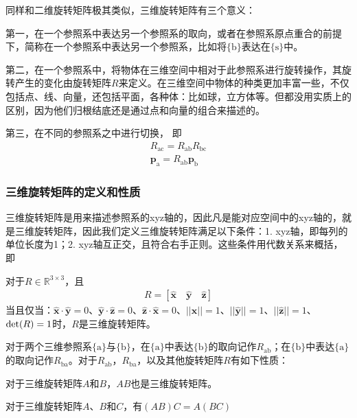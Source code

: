 \documentclass[12pt, a4paper, article, UTF8]{ctexart}
\begin{document}
同样和二维旋转矩阵极其类似，三维旋转矩阵有三个意义：

第一，在一个参照系中表达另一个参照系的取向，或者在参照系原点重合的前提下，简称在一个参照系中表达另一个参照系，比如将$\{\text{b}\}$表达在$\{\text{s}\}$中。

第二，在一个参照系中，将物体在三维空间中相对于此参照系进行旋转操作，其旋转产生的变化由旋转矩阵$R$来定义。在三维空间中物体的种类更加丰富一些，不仅包括点、线、向量，还包括平面，各种体：比如球，立方体等。但都没用实质上的区别，因为他们归根结底还是通过点和向量的组合来描述的。

第三，在不同的参照系之中进行切换， 即
\begin{align}
R_\text{ac} = R_\text{ab}R_\text{bc} \\
\mathbf{p}_\text{a} = R_\text{ab}\mathbf{p}_\text{b}
\end{align}


\subsubsection{三维旋转矩阵的定义和性质}
三维旋转矩阵是用来描述参照系的xyz轴的，因此凡是能对应空间中的xyz轴的，就是三维旋转矩阵，因此我们定义三维旋转矩阵满足以下条件：1. xyz轴，即每列的单位长度为1；2. xyz轴互正交，且符合右手正则。这些条件用代数关系来概括，即
\begin{mydefinition}
对于$R\in\mathbb{R}^{3\times3}$，且
\begin{align}
R = [\hat{\mathbf{x}} \quad \hat{\mathbf{y}} \quad \hat{\mathbf{z}}]
\end{align}
当且仅当：$\hat{\mathbf{x}}\cdot\hat{\mathbf{y}} = 0$、$\hat{\mathbf{y}}\cdot\hat{\mathbf{z}} = 0$、$\hat{\mathbf{z}}\cdot\hat{\mathbf{x}} = 0$、$||\hat{\mathbf{x}}|| = 1$、$||\hat{\mathbf{y}}|| = 1$、$||\hat{\mathbf{z}}|| = 1$、$\textnormal{det}(R) = 1$时，$R$是三维旋转矩阵。 \label{th:3drotation}
\end{mydefinition}

对于两个三维参照系$\{\text{a}\}$与$\{\text{b}\}$，在$\{\text{a}\}$中表达$\{\text{b}\}$的取向记作$R_\text{ab}$；在$\{\text{b}\}$中表达$\{\text{a}\}$的取向记作$R_\text{ba}$。对于$R_\text{ab}$，$R_\text{ba}$，以及其他旋转矩阵$R$有如下性质： 
\begin{mytheorem}
对于三维旋转矩阵$A$和$B$，$AB$也是三维旋转矩阵。\label{th:3dproductclosure}
\end{mytheorem}

\begin{mytheorem}
对于三维旋转矩阵$A$、$B$和$C$，有$(AB)C=A(BC)$ \label{th:3dassociative}
\end{mytheorem}
\end{document}
